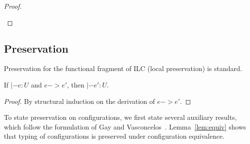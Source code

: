 \begin{theorem}[Progress]
\begin{proof}
\begin{itemize}[leftmargin=*]
\begin{llproof}




        
      \end{llproof}
    \end{itemize}    
\end{proof}  
\end{theorem}

\subsection{Preservation}

Preservation for the functional fragment of ILC (local preservation) is standard.

\begin{lemma}\label{lem:local-preservation}
  If $|- e : U$ and $e -> e'$, then $|- e' : U$.
  \begin{proof}
    By structural induction on the derivation of $e -> e'$.
  \end{proof}
\end{lemma}

To state preservation on configurations, we first state several auxiliary
results, which follow the formulation of Gay and
Vasconcelos~\cite{gay2010linear}.  Lemma~\ref{lem:equiv} shows that typing of
configurations is preserved under configuration equivalence.


